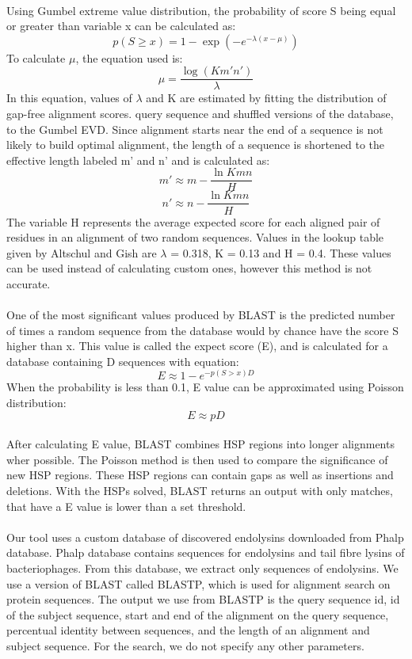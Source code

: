 \paragraph*{}
Using Gumbel extreme value distribution, the probability of score S being equal or greater than variable x can be calculated as:
\[ p(S \geq x) = 1 - \exp(-e^{-\lambda(x-\mu)}) \]
To calculate $\mu$, the equation used is:
\[ \mu = \frac{\log(K m' n')}{\lambda} \]
In this equation, values of $\lambda$ and K are estimated by fitting the distribution of gap-free alignment scores. query sequence and shuffled versions of the database, to the Gumbel EVD. Since alignment starts near the end of a sequence is not likely to build optimal alignment, the length of a sequence is shortened to the effective length labeled m' and n' and is calculated as:
\[ m' \approx m - \frac{\ln K m n}{H} \]
\[n' \approx n - \frac{\ln K m n}{H}\]
The variable H represents the average expected score for each aligned pair of residues in an alignment of two random sequences. Values in the lookup table given by Altschul and Gish are $\lambda$ = 0.318, K = 0.13 and H = 0.4. These values can be used instead of calculating custom ones, however this method is not accurate.
\paragraph*{}
One of the most significant values produced by BLAST is the predicted number of times a random sequence from the database would by chance have the score S higher than x. This value is called the expect score (E), and is calculated for a database containing D sequences with equation:
\[ E \approx 1 - e^{-p(S>x) D} \]
When the probability is less than 0.1, E value can be approximated using Poisson distribution:
\[ E \approx p D \]
\paragraph*{}
After calculating E value, BLAST combines HSP regions into longer alignments wher possible. The Poisson method is then used to compare the significance of new HSP regions. These HSP regions can contain gaps as well as insertions and deletions. With the HSPs solved, BLAST returns an output with only matches, that have a E value is lower than a set threshold.
\paragraph*{}
Our tool uses a custom database of discovered endolysins downloaded from Phalp database. Phalp database contains sequences for endolysins and tail fibre lysins of bacteriophages. From this database, we extract only sequences of endolysins. We use a version of BLAST called BLASTP, which is used for alignment search on protein sequences. The output we use from BLASTP is the query sequence id, id of the subject sequence, start and end of the alignment on the query sequence, percentual identity between sequences, and the length of an alignment and subject sequence. For the search, we do not specify any other parameters.

